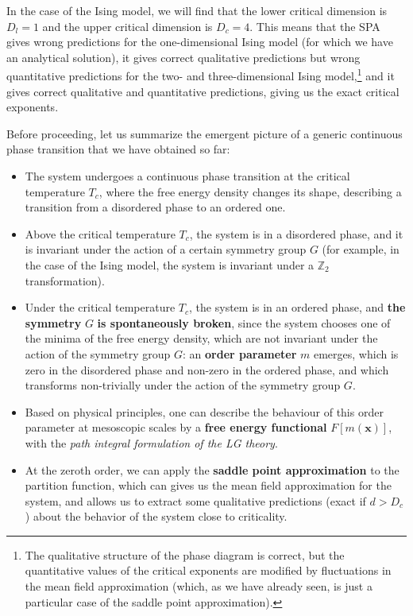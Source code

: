 In the case of the Ising model, we will find that the lower critical dimension is \(D_l = 1\) and the upper critical dimension is \(D_c = 4\). This means that the SPA gives wrong predictions for the one-dimensional Ising model (for which we have an analytical solution), it gives correct qualitative predictions but wrong quantitative predictions for the two- and three-dimensional Ising model,\footnote{The qualitative structure of the phase diagram is correct, but the quantitative values of the critical exponents are modified by fluctuations in the mean field approximation (which, as we have already seen, is just a particular case of the saddle point approximation).} and it gives correct qualitative and quantitative predictions, giving us the exact critical exponents.

Before proceeding, let us summarize the emergent picture of a generic continuous phase transition that we have obtained so far:
\begin{itemize}
    \item The system undergoes a continuous phase transition at the critical temperature \(T_c\), where the free energy density changes its shape, describing a transition from a disordered phase to an ordered one.
    \item Above the critical temperature \(T_c\), the system is in a disordered phase, and it is invariant under the action of a certain symmetry group \(G\) (for example, in the case of the Ising model, the system is invariant under a \(\mathbb{Z}_2\) transformation).
    \item Under the critical temperature \(T_c\), the system is in an ordered phase, and \textbf{the symmetry} \(G\) \textbf{is spontaneously broken}, since the system chooses one of the minima of the free energy density, which are not invariant under the action of the symmetry group \(G\): an \textbf{order parameter} \(m\) emerges, which is zero in the disordered phase and non-zero in the ordered phase, and which transforms non-trivially under the action of the symmetry group \(G\).
    \item Based on physical principles, one can describe the behaviour of this order parameter at mesoscopic scales by a \textbf{free energy functional} \(F[m(\mathbf{x})]\), with the \textit{path integral formulation of the LG theory}.
    \item At the zeroth order, we can apply the \textbf{saddle point approximation} to the partition function, which can gives us the mean field approximation for the system, and allows us to extract some qualitative predictions (exact if \(d > D_c\)) about the behavior of the system close to criticality.
\end{itemize}

